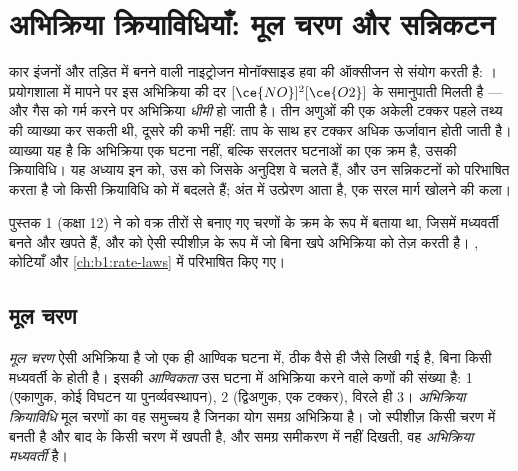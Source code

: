 \chapter{अभिक्रिया क्रियाविधियाँ: मूल चरण और सन्निकटन}\label{ch:b1:elementary-steps}

कार इंजनों और तड़ित में बनने वाली नाइट्रोजन मोनॉक्साइड हवा की ऑक्सीजन से
संयोग करती है: । प्रयोगशाला में मापने पर इस अभिक्रिया की
दर $[\ce{NO}]^2[\ce{O2}]$ के समानुपाती मिलती है --- और गैस को गर्म करने पर
अभिक्रिया \emph{धीमी} हो जाती है। तीन अणुओं की एक अकेली टक्कर पहले तथ्य की
व्याख्या कर सकती थी, दूसरे की कभी नहीं: ताप के साथ हर टक्कर अधिक
ऊर्जावान होती जाती है। व्याख्या यह है कि अभिक्रिया एक घटना नहीं, बल्कि
सरलतर घटनाओं का एक क्रम है, उसकी क्रियाविधि। यह अध्याय इन  को,
उस  को जिसके अनुदिश वे चलते हैं, और उन सन्निकटनों को परिभाषित करता है
जो किसी क्रियाविधि को  में बदलते हैं; अंत में उत्प्रेरण आता है, एक
सरल मार्ग खोलने की कला।

\begin{recall}
पुस्तक 1 (कक्षा 12) ने  को वक्र तीरों से बनाए गए चरणों के
क्रम के रूप में बताया था, जिसमें मध्यवर्ती बनते और खपते हैं, और
 को ऐसी स्पीशीज़ के रूप में जो बिना खपे अभिक्रिया को तेज़ करती है।
, कोटियाँ और 
\cref{ch:b1:rate-laws} में परिभाषित किए गए।
\end{recall}

\section{मूल चरण}

\begin{definition}[मूल चरण, आण्विकता, क्रियाविधि]\label{def:b1:elementary-steps:elementary-step}
\emph{मूल चरण} ऐसी अभिक्रिया है जो
एक ही आण्विक घटना में, ठीक वैसे ही जैसे लिखी गई है, बिना किसी
मध्यवर्ती के होती है। इसकी \emph{आण्विकता} उस घटना में
अभिक्रिया करने वाले कणों की संख्या है: 1 (एकाणुक, कोई विघटन या
पुनर्व्यवस्थापन), 2 (द्विअणुक, एक टक्कर), विरले ही 3। \emph{अभिक्रिया
क्रियाविधि} मूल चरणों का वह समुच्चय है जिनका
योग समग्र अभिक्रिया है। जो स्पीशीज़ किसी चरण में बनती है और बाद के किसी चरण में
खपती है, और समग्र समीकरण में नहीं दिखती, वह \emph{अभिक्रिया
मध्यवर्ती} है।
\end{definition}

